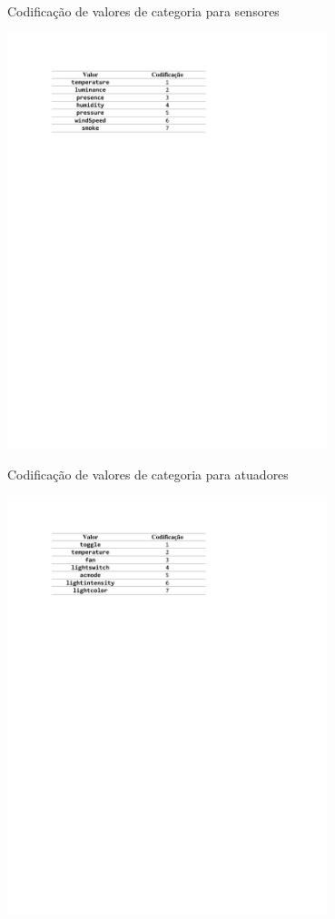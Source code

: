 \begin{table}[hp]	
	\centering
	\caption{Codificação de valores de categoria para sensores}\smallskip
	\label{tab:cod_data_category}
	\includegraphics[width=0.7\textwidth]{tabelas/cod_data_category.pdf}
\end{table}

\begin{table}[hp]	
	\centering
	\caption{Codificação de valores de categoria para atuadores}\smallskip
	\label{tab:cod_command_category}
	\includegraphics[width=0.7\textwidth]{tabelas/cod_command_category.pdf}
\end{table}

